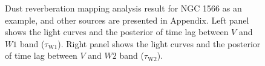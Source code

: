 \documentclass[linenumbers]{aastex631}
\begin{document}
\begin{figure}[b]
\caption{Dust reverberation mapping analysis result for NGC 1566 as an example, and other sources are presented in Appendix. Left panel shows the light curves and the posterior of time lag between $V$ and $W1$ band ($\tau_\mathrm{W1}$). Right panel shows the light curves and the posterior of time lag between $V$ and $W2$ band ($\tau_\mathrm{W2}$).}
\label{fig:lag_NGC1566}
\end{figure}
\end{document}
